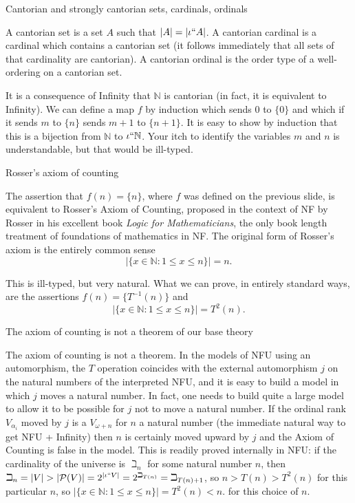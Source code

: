 \documentclass{slides}
\begin{document}
\begin{slide}
{\Large Cantorian and strongly cantorian sets, cardinals, ordinals}

A cantorian set is a set $A$ such that $|A| = |\iota``A|$.  A cantorian cardinal is a cardinal which contains a cantorian set (it follows immediately that all sets of that cardinality are cantorian).  A cantorian ordinal is the order type of a well-ordering on a cantorian set.

It is a consequence of Infinity that $\mathbb N$ is cantorian (in fact, it is equivalent to Infinity).  We can define a map $f$  by induction which sends 0 to $\{0\}$ and which
if it sends $m$ to $\{n\}$ sends $m+1$ to $\{n+1\}$.  It is easy to show by induction that this is a bijection from $\mathbb N$ to $\iota``\mathbb N$.  Your itch to identify the variables
$m$ and $n$ is understandable, but that would be ill-typed.


\end{slide}

\begin{slide}
{\Large Rosser's axiom of counting}

The assertion that $f(n) = \{n\}$, where $f$ was defined on the previous slide, is equivalent to Rosser's Axiom of Counting, proposed in the context of NF by Rosser in his excellent book {\em Logic for Mathematicians\/}, the only book length treatment of foundations of mathematics in NF.  The original form of Rosser's axiom is the entirely common sense $$|\{x \in {\mathbb N}:1 \leq x \leq n\}| = n.$$

This is ill-typed, but very natural.  What we can prove, in entirely standard ways, are the assertions $f(n) = \{T^{-1}(n)\}$ and $$|\{x \in {\mathbb N}:1 \leq x \leq n\}| = T^2(n).$$


\end{slide}

\begin{slide}

{\Large The axiom of counting is not a theorem of our base theory}

The axiom of counting is not a theorem.  In the models of NFU using an automorphism,  the $T$ operation coincides with the external automorphism $j$ on the natural numbers of the interpreted NFU, and it is easy to build a model in which $j$ moves a natural number.  In fact, one needs to build quite a large model to allow it to be possible for $j$ not to move a natural number.  If the ordinal rank $V_{\alpha_i}$ moved by $j$ is a $V_{\omega +n}$ for $n$ a natural number (the immediate natural way to get NFU + Infinity) then $n$ is certainly moved upward by $j$ and the Axiom of Counting is false in the model.  This is readily proved internally in NFU: if the cardinality of the universe is $\beth_n$ for some natural number $n$,
then $\beth_n = |V| > |{\cal P}(V)| = 2^{|\iota``V|} = 2^{\beth_{T(n)}} = \beth_{T(n)+1}$, so $n>T(n)>T^2(n)$ for this particular $n$, so $|\{x \in {\mathbb N}:1 \leq x \leq n\}| = T^2(n)<n.$ for this choice of $n$.


\end{slide}
\end{document}
